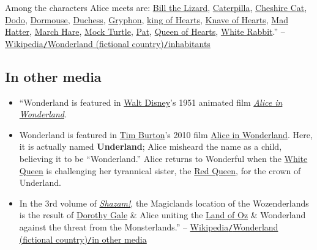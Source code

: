 \documentclass[oneside]{book}
\numberwithin{equation}{section}
\begin{document}
Among the characters Alice meets are: \href{https://en.wikipedia.org/wiki/Bill_the_Lizard}{Bill the Lizard}, \href{https://en.wikipedia.org/wiki/Caterpillar_(Alice%27s_Adventures_in_Wonderland)}{Caterpilla}, \href{https://en.wikipedia.org/wiki/Cheshire_Cat}{Cheshire Cat}, \href{https://en.wikipedia.org/wiki/Dodo_(Alice%27s_Adventures_in_Wonderland)}{Dodo}, \href{https://en.wikipedia.org/wiki/Dormouse_(Alice%27s_Adventures_in_Wonderland)}{Dormouse}, \href{https://en.wikipedia.org/wiki/Duchess_(Alice%27s_Adventures_in_Wonderland)}{Duchess}, \href{https://en.wikipedia.org/wiki/Gryphon_(Alice%27s_Adventures_in_Wonderland)}{Gryphon},  \href{https://en.wikipedia.org/wiki/King_of_Hearts_(Alice%27s_Adventures_in_Wonderland)}{king of Hearts}, \href{https://en.wikipedia.org/wiki/Knave_of_Hearts_(Alice%27s_Adventures_in_Wonderland)}{Knave of Hearts}, \href{https://en.wikipedia.org/wiki/Hatter_(Alice%27s_Adventures_in_Wonderland)}{Mad Hatter}, \href{https://en.wikipedia.org/wiki/March_Hare}{March Hare}, \href{https://en.wikipedia.org/wiki/Mock_Turtle}{Mock Turtle}, \href{https://en.wikipedia.org/wiki/Pat_(Alice%27s_Adventures_in_Wonderland)}{Pat}, \href{https://en.wikipedia.org/wiki/Queen_of_Hearts_(Alice%27s_Adventures_in_Wonderland)}{Queen of Hearts}, \href{https://en.wikipedia.org/wiki/White_Rabbit}{White Rabbit}.'' -- \href{https://en.wikipedia.org/wiki/Wonderland_(fictional_country)#Inhabitants}{Wikipedia\texttt{/}Wonderland (fictional country)\texttt{/}inhabitants}

\subsection{In other media}
\begin{itemize}
	\item ``Wonderland is featured in \href{https://en.wikipedia.org/wiki/Walt_Disney}{Walt Disney}'s 1951 animated film \href{https://en.wikipedia.org/wiki/Alice_in_Wonderland_(1951_film)}{\textit{Alice in Wonderland}}.
	\item Wonderland is featured in \href{https://en.wikipedia.org/wiki/Tim_Burton}{Tim Burton}'s 2010 film \href{https://en.wikipedia.org/wiki/Alice_in_Wonderland_(2010_film)}{Alice in Wonderland}. Here, it is actually named \textbf{Underland}; Alice misheard the name as a child, believing it to be ``Wonderland.'' Alice returns to Wonderful when the \href{https://en.wikipedia.org/wiki/White_Queen_(Through_the_Looking-Glass)}{White Queen} is challenging her tyrannical sister, the \href{https://en.wikipedia.org/wiki/Red_Queen_(Through_the_Looking-Glass)}{Red Queen}, for the crown of Underland.
	\item In the 3rd volume of \href{https://en.wikipedia.org/wiki/Captain_Marvel_(DC_Comics)}{\textit{Shazam!}}, the Magiclands location of the Wozenderlands is the result of \href{https://en.wikipedia.org/wiki/Dorothy_Gale}{Dorothy Gale} \& Alice uniting the \href{https://en.wikipedia.org/wiki/Land_of_Oz}{Land of Oz} \& Wonderland against the threat from the Monsterlands.'' -- \href{https://en.wikipedia.org/wiki/Wonderland_(fictional_country)#In_other_media}{Wikipedia\texttt{/}Wonderland (fictional country)\texttt{/}in other media}
\end{itemize}
\end{document}
